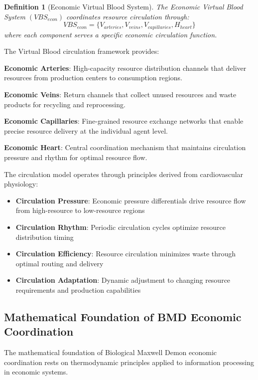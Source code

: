 \documentclass[12pt,a4paper]{article}
\newtheorem{definition}[theorem]{Definition}
\begin{document}
\begin{definition}[Economic Virtual Blood System]
The Economic Virtual Blood System $(VBS_{econ})$ coordinates resource circulation through:
\begin{equation}
VBS_{econ} = \{V_{arteries}, V_{veins}, V_{capillaries}, H_{heart}\}
\end{equation}
where each component serves a specific economic circulation function.
\end{definition}

The Virtual Blood circulation framework provides:

\textbf{Economic Arteries}: High-capacity resource distribution channels that deliver resources from production centers to consumption regions.

\textbf{Economic Veins}: Return channels that collect unused resources and waste products for recycling and reprocessing.

\textbf{Economic Capillaries}: Fine-grained resource exchange networks that enable precise resource delivery at the individual agent level.

\textbf{Economic Heart}: Central coordination mechanism that maintains circulation pressure and rhythm for optimal resource flow.

The circulation model operates through principles derived from cardiovascular physiology:
\begin{itemize}
\item \textbf{Circulation Pressure}: Economic pressure differentials drive resource flow from high-resource to low-resource regions
\item \textbf{Circulation Rhythm}: Periodic circulation cycles optimize resource distribution timing
\item \textbf{Circulation Efficiency}: Resource circulation minimizes waste through optimal routing and delivery
\item \textbf{Circulation Adaptation}: Dynamic adjustment to changing resource requirements and production capabilities
\end{itemize}

\subsection{Mathematical Foundation of BMD Economic Coordination}

The mathematical foundation of Biological Maxwell Demon economic coordination rests on thermodynamic principles applied to information processing in economic systems.
\end{document}
